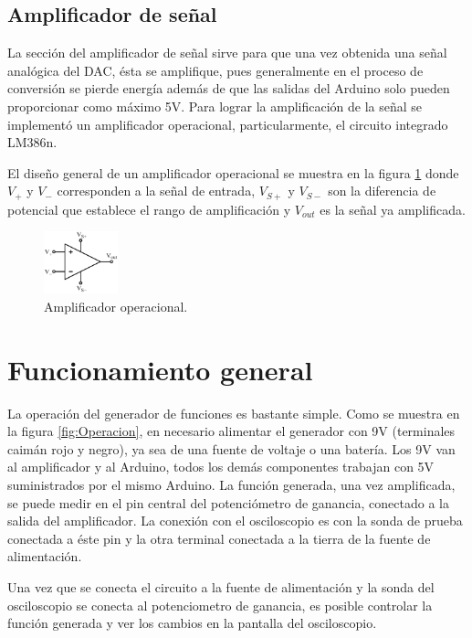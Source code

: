 \documentclass[11pt]{article}
\begin{document}
\subsection*{Amplificador de señal}
La sección del amplificador de señal sirve para que una vez obtenida una señal analógica del DAC, ésta se amplifique, pues generalmente en el proceso de conversión se pierde energía además de que las salidas del Arduino solo pueden proporcionar como máximo 5V.
Para lograr la amplificación de la señal se implementó un amplificador operacional, particularmente, el circuito integrado LM386n.

El diseño general de un amplificador operacional se muestra en la figura \ref{fig:Op-amp} donde $V_+$ y $V_-$ corresponden a la señal de entrada, $V_{S+}$ y $V_{S-}$ son la diferencia de potencial que establece el rango de amplificación y $V_{out}$ es la señal ya amplificada.

\begin{figure}[H]
\centering
\includegraphics[width = 0.19\textwidth]{Op-amp.PNG}
\caption{Amplificador operacional.}
\label{fig:Op-amp}
\end{figure}


\section{Funcionamiento general}
La operación del generador de funciones es bastante simple. Como se muestra en la figura \ref{fig:Operacion}, en necesario alimentar el generador con 9V (terminales caimán rojo y negro), ya sea de una fuente de voltaje o una batería. Los 9V van al amplificador y al Arduino, todos los demás componentes trabajan con 5V suministrados por el mismo Arduino. La función generada, una vez amplificada, se puede medir en el pin central del potenciómetro de ganancia, conectado a la salida del amplificador. La conexión con el osciloscopio es con la sonda de prueba conectada a éste pin y la otra terminal conectada a la tierra de la fuente de alimentación.

Una vez que se conecta el circuito a la fuente de alimentación y la sonda del osciloscopio se conecta al potenciometro de ganancia, es posible controlar la función generada y ver los cambios en la pantalla del osciloscopio.
\end{document}
